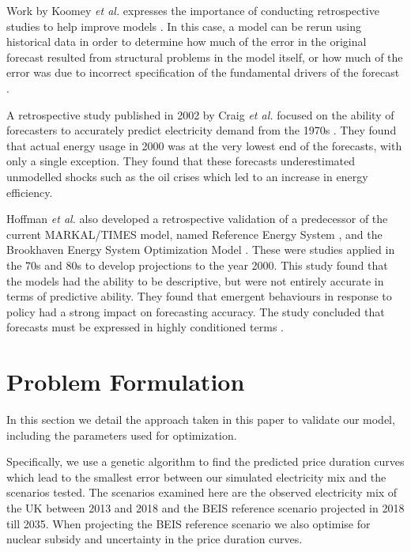 Work by Koomey \textit{et al.} expresses the importance of conducting retrospective studies to help improve models \cite{Koomey2003}. In this case, a model can be rerun using historical data in order to determine how much of the error in the original forecast resulted from structural problems in the model itself, or how much of the error was due to incorrect specification of the fundamental drivers of the forecast \cite{Koomey2003}.

A retrospective study published in 2002 by Craig \textit{et al.} focused on the ability of forecasters to accurately predict electricity demand from the 1970s \cite{Craig2002}. They found that actual energy usage in 2000 was at the very lowest end of the forecasts, with only a single exception. They found that these forecasts underestimated unmodelled shocks such as the oil crises which led to an increase in energy efficiency.

Hoffman \textit{et al.} also developed a retrospective validation of a predecessor of the current MARKAL\slash TIMES model, named Reference Energy System \cite{Hoffman_1973}, and the Brookhaven Energy System Optimization Model \cite{ERDA_48}. These were studies applied in the 70s and 80s to develop projections to the year 2000. This study found that the models had the ability to be descriptive, but were not entirely accurate in terms of predictive ability. They found that emergent behaviours in response to policy had a strong impact on forecasting accuracy. The study concluded that forecasts must be expressed in highly conditioned terms \cite{Hoffman2011}. 



\section{Problem Formulation}
\label{ssec:prob_formulation}

In this section we detail the approach taken in this paper to validate our model, including the parameters used for optimization. 

Specifically, we use a genetic algorithm to find the predicted price duration curves which lead to the smallest error between our simulated electricity mix and the scenarios tested. The scenarios examined here are the observed electricity mix of the UK between 2013 and 2018 and the BEIS reference scenario projected in 2018 till 2035. When projecting the BEIS reference scenario we also optimise for nuclear subsidy and uncertainty in the price duration curves.





